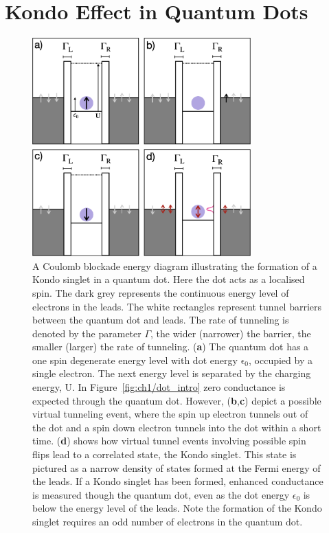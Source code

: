 \afterpage{\clearpage}
\section{Kondo Effect in Quantum Dots}

\begin{figure}[!hbt]
 \begin{center}
  \includegraphics[width=0.75\textwidth]{figures/ch2/crop_FiguresMaster.010.png}
  \caption[Kondo effect in a quantum dot: Coulomb blockade energy diagrams]{\label{fig:ch2/kondo_dot_diagram} 
  A Coulomb blockade energy diagram illustrating the formation of a Kondo singlet in a quantum dot. Here the dot acts as a localised spin. The dark grey represents the continuous energy level of electrons in the leads. The white rectangles represent tunnel barriers between the quantum dot and leads. The rate of tunneling is denoted by the parameter $\Gamma$, the wider (narrower) the barrier, the smaller (larger) the rate of tunneling. (\textbf{a}) The quantum dot has a one spin degenerate energy level with dot energy $\mathrm{\epsilon_0}$, occupied by a single electron. The next energy level is separated by the charging energy, $\mathrm{U}$. In Figure~\ref{fig:ch1/dot_intro} zero conductance is expected through the quantum dot. However, (\textbf{b},\textbf{c}) depict a possible virtual tunneling event, where the spin up electron tunnels out of the dot and a spin down electron tunnels into the dot within a short time. (\textbf{d}) shows how virtual tunnel events involving possible spin flips lead to a correlated state, the Kondo singlet. This state is pictured as a narrow density of states formed at the Fermi energy of the leads. If a Kondo singlet has been formed, enhanced conductance is measured though the quantum dot, even as the dot energy $\epsilon_0$ is below the energy level of the leads. Note the formation of the Kondo singlet requires an odd number of electrons in the quantum dot.
   }
 \end{center}
\end{figure}


